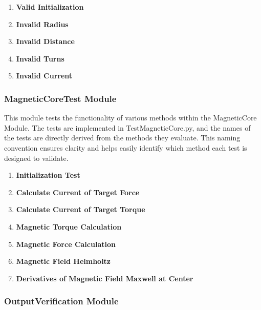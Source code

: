 \documentclass[12pt, titlepage]{article}
\newcommand{\UTthettnum}{UT\theuttnum}
\begin{document}
\begin{enumerate}
  \item[\refstepcounter{uttnum} \UTthettnum:] \textbf{Valid Initialization}
  \item[\refstepcounter{uttnum} \UTthettnum:] \textbf{Invalid Radius}
  \item[\refstepcounter{uttnum} \UTthettnum:] \textbf{Invalid Distance}
  \item[\refstepcounter{uttnum} \UTthettnum:] \textbf{Invalid Turns}
  \item[\refstepcounter{uttnum} \UTthettnum:] \textbf{Invalid Current}
\end{enumerate}

\subsubsection{MagneticCoreTest Module}

This module tests the functionality of various methods within the MagneticCore Module. The tests are implemented in TestMagneticCore.py, and the names of the tests are directly derived from the methods they evaluate. This naming convention ensures clarity and helps easily identify which method each test is designed to validate. 

\begin{enumerate}
  \item[\refstepcounter{uttnum} \UTthettnum:] \textbf{Initialization Test}
  \item[\refstepcounter{uttnum} \UTthettnum:] \textbf{Calculate Current of Target Force}
  \item[\refstepcounter{uttnum} \UTthettnum:] \textbf{Calculate Current of Target Torque}
  \item[\refstepcounter{uttnum} \UTthettnum:] \textbf{Magnetic Torque Calculation}
  \item[\refstepcounter{uttnum} \UTthettnum:] \textbf{Magnetic Force Calculation}
  \item[\refstepcounter{uttnum} \UTthettnum:] \textbf{Magnetic Field Helmholtz}
  \item[\refstepcounter{uttnum} \UTthettnum:] \textbf{Derivatives of Magnetic Field Maxwell at Center} 
\end{enumerate}


\subsubsection{OutputVerification Module}
\end{document}
